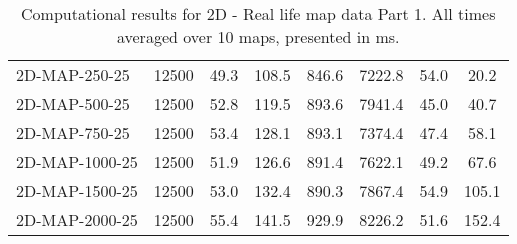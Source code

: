 \documentclass{article}
\begin{document}
\begin{center}
\begin{table}[h]
\begin{tabular}{|l||c|c|c|c|c|c|c|}
            2D-MAP-250-25                  & 12500 & 49.3      & 108.5      & 846.6       & 7222.8   & 54.0      & 20.2       \\
            2D-MAP-500-25                  & 12500 & 52.8      & 119.5      & 893.6       & 7941.4   & 45.0      & 40.7       \\
            2D-MAP-750-25                  & 12500 & 53.4      & 128.1      & 893.1       & 7374.4   & 47.4      & 58.1       \\
            2D-MAP-1000-25                 & 12500 & 51.9      & 126.6      & 891.4       & 7622.1   & 49.2      & 67.6       \\
            2D-MAP-1500-25                 & 12500 & 53.0      & 132.4      & 890.3       & 7867.4   & 54.9      & 105.1      \\
            2D-MAP-2000-25                 & 12500 & 55.4      & 141.5      & 929.9       & 8226.2   & 51.6      & 152.4      \\
            \hline
        \end{tabular}
        \caption{Computational results for 2D - Real life map data Part 1. All times averaged over 10 maps, presented in ms.}
    \end{table}
\end{center}
\end{document}
